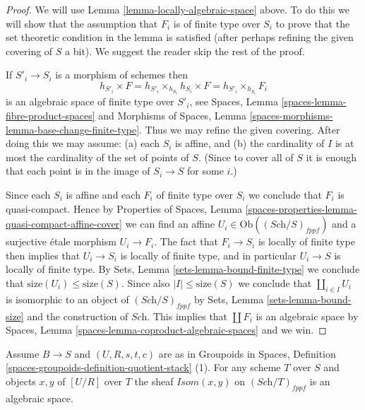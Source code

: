 \begin{proof}
We will use
Lemma \ref{lemma-locally-algebraic-space}
above. To do this we will show that the assumption that
$F_i$ is of finite type over $S_i$ to prove that the set theoretic
condition in the lemma is satisfied (after perhaps refining the given 
covering of $S$ a bit).
We suggest the reader skip the rest of the proof.

\medskip\noindent
If $S'_i \to S_i$ is a morphism of schemes then
$$
h_{S'_i} \times F =
h_{S'_i} \times_{h_{S_i}} h_{S_i} \times F =
h_{S'_i} \times_{h_{S_i}} F_i
$$
is an algebraic space of finite type over $S'_i$, see
Spaces, Lemma \ref{spaces-lemma-fibre-product-spaces}
and
Morphisms of Spaces,
Lemma \ref{spaces-morphisms-lemma-base-change-finite-type}.
Thus we may refine the given covering. After doing this we may assume:
(a) each $S_i$ is affine, and (b) the cardinality of $I$ is at most
the cardinality of the set of points of $S$. (Since to cover
all of $S$ it is enough that each point is in the image of $S_i \to S$
for some $i$.)

\medskip\noindent
Since each $S_i$ is affine and each $F_i$ of finite type over $S_i$
we conclude that $F_i$ is quasi-compact. Hence by
Properties of Spaces,
Lemma \ref{spaces-properties-lemma-quasi-compact-affine-cover}
we can find an affine $U_i \in \text{Ob}((\textit{Sch}/S)_{fppf})$
and a surjective \'etale morphism $U_i \to F_i$. The fact that
$F_i \to S_i$ is locally of finite type then implies that
$U_i \to S_i$ is locally of finite type, and in particular
$U_i \to S$ is locally of finite type. By
Sets, Lemma \ref{sets-lemma-bound-finite-type}
we conclude that $\text{size}(U_i) \leq \text{size}(S)$.
Since also $|I| \leq \text{size}(S)$ we conclude that
$\coprod_{i \in I} U_i$ is isomorphic to an object of
$(\textit{Sch}/S)_{fppf}$ by
Sets, Lemma \ref{sets-lemma-bound-size}
and the construction of $\textit{Sch}$. This implies that
$\coprod F_i$ is an algebraic space by
Spaces, Lemma \ref{spaces-lemma-coproduct-algebraic-spaces}
and we win.
\end{proof}

\begin{lemma}
\label{lemma-quotient-stack-isom}
Assume $B \to S$ and $(U, R, s, t, c)$ are as in
Groupoids in Spaces,
Definition \ref{spaces-groupoids-definition-quotient-stack} (1).
For any scheme $T$ over $S$ and objects $x, y$ of $[U/R]$ over $T$
the sheaf $\mathit{Isom}(x, y)$ on $(\textit{Sch}/T)_{fppf}$
is an algebraic space.
\end{lemma}

